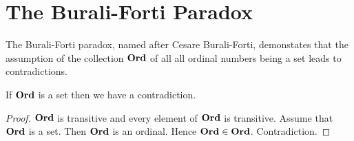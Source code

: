 \documentclass{article}
\begin{document}
  \section*{The Burali-Forti Paradox}

  The Burali-Forti paradox, named after Cesare Burali-Forti, demonstates that
  the assumption of the collection $\mathbf{Ord}$ of all all ordinal numbers being a set
  leads to contradictions.

  \begin{forthel}
    \begin{theorem*}
      If $\mathbf{Ord}$ is a set then we have a contradiction.
    \end{theorem*}
    \begin{proof}
      $\mathbf{Ord}$ is transitive and every element of $\mathbf{Ord}$ is transitive.
      Assume that $\mathbf{Ord}$ is a set.
      Then $\mathbf{Ord}$ is an ordinal.
      Hence $\mathbf{Ord} \in \mathbf{Ord}$.
      Contradiction.
    \end{proof}
  \end{forthel}
\end{document}
